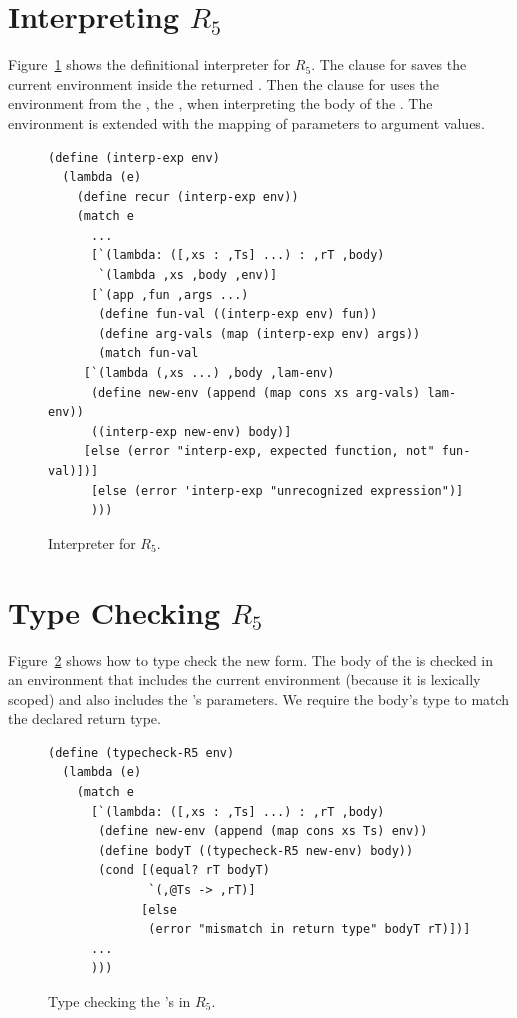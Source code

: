 \documentclass[11pt]{book}
\begin{document}
\section{Interpreting $R_5$}

Figure~\ref{fig:interp-R5} shows the definitional interpreter for
$R_5$. The clause for  saves the current environment
inside the returned . Then the clause for  uses
the environment from the , the , when
interpreting the body of the .  The 
environment is extended with the mapping of parameters to argument
values.

\begin{figure}[tbp]
\begin{lstlisting}
(define (interp-exp env)
  (lambda (e)
    (define recur (interp-exp env))
    (match e
      ...
      [`(lambda: ([,xs : ,Ts] ...) : ,rT ,body)
       `(lambda ,xs ,body ,env)]
      [`(app ,fun ,args ...)
       (define fun-val ((interp-exp env) fun))
       (define arg-vals (map (interp-exp env) args))
       (match fun-val
	 [`(lambda (,xs ...) ,body ,lam-env)
	  (define new-env (append (map cons xs arg-vals) lam-env))
	  ((interp-exp new-env) body)]
	 [else (error "interp-exp, expected function, not" fun-val)])]
      [else (error 'interp-exp "unrecognized expression")]
      )))
\end{lstlisting}
\caption{Interpreter for $R_5$.}
\label{fig:interp-R5}
\end{figure}

\section{Type Checking $R_5$}

Figure~\ref{fig:typecheck-R5} shows how to type check the new
 form. The body of the  is checked in an
environment that includes the current environment (because it is
lexically scoped) and also includes the 's parameters.  We
require the body's type to match the declared return type.

\begin{figure}[tbp]
\begin{lstlisting}
(define (typecheck-R5 env)
  (lambda (e)
    (match e
      [`(lambda: ([,xs : ,Ts] ...) : ,rT ,body)
       (define new-env (append (map cons xs Ts) env))
       (define bodyT ((typecheck-R5 new-env) body))
       (cond [(equal? rT bodyT)
              `(,@Ts -> ,rT)]
             [else
              (error "mismatch in return type" bodyT rT)])]
      ...
      )))
\end{lstlisting}
\caption{Type checking the 's in $R_5$.}
\label{fig:typecheck-R5}
\end{figure}
\end{document}
